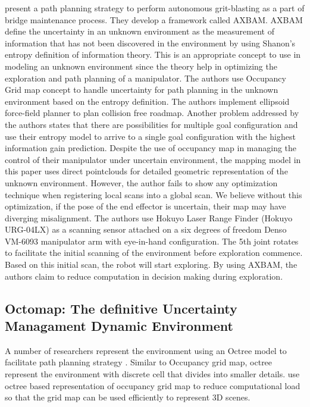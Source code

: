 \textcite{Paul2011} present a path planning strategy to perform autonomous
grit-blasting as a part of bridge maintenance process. They develop a framework called
\acrfull{AXBAM}. AXBAM define the uncertainty in an
unknown environment as the measurement of information that has not been discovered in the
environment by using Shanon's entropy definition of information theory. This is an appropriate
concept to use in modeling an unknown environment since the theory help in optimizing the
exploration and path planning of a manipulator. The authors use Occupancy Grid map concept
to handle uncertainty for path planning in the unknown environment based on the entropy
definition. The authors implement ellipsoid force-field planner to plan collision free roadmap.
Another problem addressed by the authors states that there are possibilities for multiple goal
configuration and use their entropy model to arrive to a single goal configuration with the highest
information gain prediction. Despite the use of occupancy map in managing the control of their
manipulator under uncertain environment, 
the mapping model in this paper uses direct pointclouds for detailed geometric representation 
of the unknown environment. However, the author
fails to show any optimization technique when registering local scans into a global scan. We
believe without this optimization, if the pose of the end effector is uncertain, their map may have
diverging misalignment. The authors use Hokuyo Laser Range Finder (Hokuyo URG-04LX) as a
scanning sensor attached on a six degrees of freedom Denso VM-6093 manipulator arm with
eye-in-hand configuration. The 5th joint rotates to facilitate the initial scanning of the
environment before exploration commence. Based on this initial scan, the robot will start
exploring. By using AXBAM, the authors claim to reduce computation in decision making during
exploration.
\subsection{Octomap: The definitive Uncertainty Managament Dynamic Environment}\label{sec:octomap}

A number of researchers represent the environment using an Octree model to facilitate path
planning strategy \parencite{Faverjon1984,Hamada1996}. Similar to Occupancy grid map,
octree represent the environment with discrete cell that divides into smaller details. 
\textcite{Payeur1997} use octree based representation of occupancy grid map to reduce computational load
so that the grid map can be used efficiently to represent 3D scenes.

